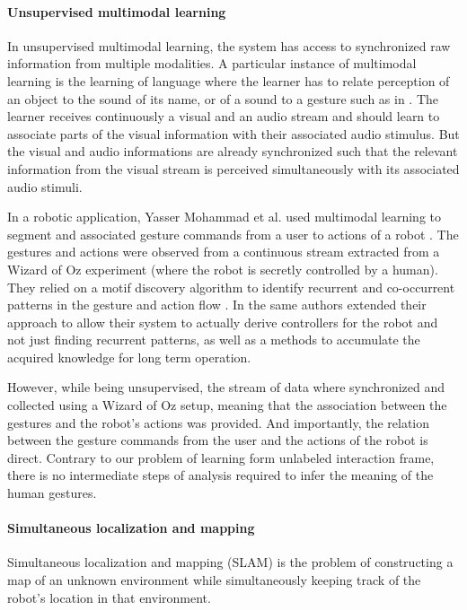 \paragraph{Unsupervised multimodal learning} In unsupervised multimodal learning, the system has access to synchronized raw information from multiple modalities. A particular instance of multimodal learning is the learning of language where the learner has to relate perception of an object to the sound of its name, or of a sound to a gesture such as in \cite{mangin2013learning}. The learner receives continuously a visual and an audio stream and should learn to associate parts of the visual information with their associated audio stimulus. But the visual and audio informations are already synchronized such that the relevant information from the visual stream is perceived simultaneously with its associated audio stimuli.

In a robotic application, Yasser Mohammad et al. used multimodal learning to segment and associated gesture commands from a user to actions of a robot \cite{mohammad2009unsupervised}. The gestures and actions were observed from a continuous stream extracted from a Wizard of Oz experiment (where the robot is secretly controlled by a human). They relied on a motif discovery algorithm to identify recurrent and co-occurrent patterns in the gesture and action flow \cite{mohammad2009constrained}. In \cite{mohammad2010learning} the same authors extended their approach to allow their system to actually derive controllers for the robot and not just finding recurrent patterns, as well as a methods to accumulate the acquired knowledge for long term operation.

However, while being unsupervised, the stream of data where synchronized and collected using a Wizard of Oz setup, meaning that the association between the gestures and the robot's actions was provided. And importantly, the relation between the gesture commands from the user and the actions of the robot is direct. Contrary to our problem of learning form unlabeled interaction frame, there is no intermediate steps of analysis required to infer the meaning of the human gestures.

\paragraph{Simultaneous localization and mapping}

Simultaneous localization and mapping (SLAM) \cite{smith1990estimating,dissanayake2001solution} is  the problem of constructing a map of an unknown environment while simultaneously keeping track of the robot's location in that environment. 

